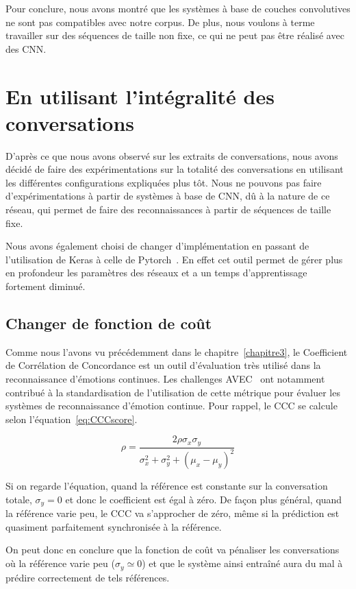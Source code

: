 Pour conclure, nous avons montré que les systèmes à base de couches convolutives ne sont pas compatibles avec notre corpus. De plus, nous voulons à terme travailler sur des séquences de taille non fixe, ce qui ne peut pas être réalisé avec des CNN.

\section{En utilisant l'intégralité des conversations}
D'après ce que nous avons observé sur les extraits de conversations, nous avons décidé de faire des expérimentations sur la totalité des conversations en utilisant les différentes configurations expliquées plus tôt. Nous ne pouvons pas faire d'expérimentations à partir de systèmes à base de CNN, dû à la nature de ce réseau, qui permet de faire des reconnaissances à partir de séquences de taille fixe.

Nous avons également choisi de changer d'implémentation en passant de l'utilisation de Keras à celle de Pytorch~\cite{pytorch}. En effet cet outil permet de gérer plus en profondeur les paramètres des réseaux et a un temps d'apprentissage fortement diminué.

\subsection{Changer de fonction de coût}
Comme nous l'avons vu précédemment dans le chapitre~\ref{chapitre3}, le Coefficient de Corrélation de Concordance est un outil d'évaluation très utilisé dans la reconnaissance d'émotions continues. Les challenges AVEC~\cite{AVEC2018} ont notamment contribué à la standardisation de l'utilisation de cette métrique pour évaluer les systèmes de reconnaissance d'émotion continue. Pour rappel, le CCC se calcule selon l'équation~\ref{eq:CCCscore}.

\begin{equation}
   \rho = \frac{2\rho\sigma_x\sigma_y}{\sigma_x^2 + \sigma_y^2 + (\mu_x - \mu_y)^2}
\label{eq:CCCscore}
\end{equation}

Si on regarde l'équation, quand la référence est constante sur la conversation totale, $\sigma_y = 0$ et donc le coefficient est égal à zéro. De façon plus général, quand la référence varie peu, le CCC va s'approcher de zéro, même si la prédiction est quasiment parfaitement synchronisée à la référence.

On peut donc en conclure que la fonction de coût va pénaliser les conversations où la référence varie peu ($\sigma_y \simeq 0$) et que le système ainsi entraîné aura du mal à prédire correctement de tels références.

